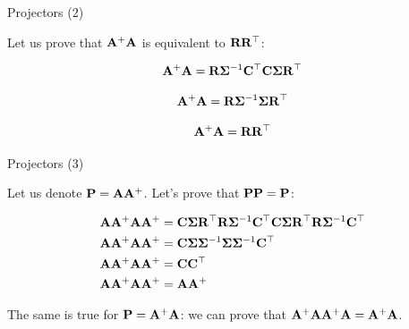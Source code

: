 \documentclass{beamer}
\begin{document}
\begin{frame}{Projectors (2)}
	\begin{flushleft}
		
		Let us prove that $\mathbf{A}^+\mathbf{A}$ is equivalent to $\mathbf{R}\mathbf{R}^\top$:
		
		\begin{equation}
			\mathbf{A}^+ \mathbf{A} = 
			\mathbf{R} \mathbf{\Sigma}^{-1} \mathbf{C}^\top
			\mathbf{C} \mathbf{\Sigma} \mathbf{R}^\top 
		\end{equation}
		
		\begin{equation}
			\mathbf{A}^+ \mathbf{A} = 
			\mathbf{R} \mathbf{\Sigma}^{-1} \mathbf{\Sigma} \mathbf{R}^\top 
		\end{equation}		
		
		\begin{equation}
			\mathbf{A}^+ \mathbf{A} = 
			\mathbf{R} \mathbf{R}^\top 
		\end{equation}			
		
	\end{flushleft}
\end{frame}





\begin{frame}{Projectors (3)}
	\begin{flushleft}
		
		Let us denote $\mathbf{P} = \mathbf{A}\mathbf{A}^+$. 
		Let's prove that $\mathbf{P}\mathbf{P} = \mathbf{P}$:
		
		\begin{align}
			\mathbf{A} \mathbf{A}^+ \mathbf{A} \mathbf{A}^+ &= 
			\mathbf{C} \mathbf{\Sigma} \mathbf{R}^\top 
			\mathbf{R} \mathbf{\Sigma}^{-1} \mathbf{C}^\top 
			\mathbf{C} \mathbf{\Sigma} \mathbf{R}^\top 
			\mathbf{R} \mathbf{\Sigma}^{-1} \mathbf{C}^\top
			\\
			\mathbf{A} \mathbf{A}^+ \mathbf{A} \mathbf{A}^+ &= 
			\mathbf{C} \mathbf{\Sigma} \mathbf{\Sigma}^{-1}\mathbf{\Sigma} \mathbf{\Sigma}^{-1} \mathbf{C}^\top
			\\
			\mathbf{A} \mathbf{A}^+ \mathbf{A} \mathbf{A}^+ &= 
			\mathbf{C} \mathbf{C}^\top
			\\
			\mathbf{A} \mathbf{A}^+ \mathbf{A} \mathbf{A}^+ &= 
			\mathbf{A} \mathbf{A}^+
		\end{align}
		
		
		The same is true for $\mathbf{P} = \mathbf{A}^+\mathbf{A}$: we can prove that $\mathbf{A}^+\mathbf{A} \mathbf{A}^+\mathbf{A} = \mathbf{A}^+\mathbf{A}$.
		
	\end{flushleft}
\end{frame}
\end{document}
